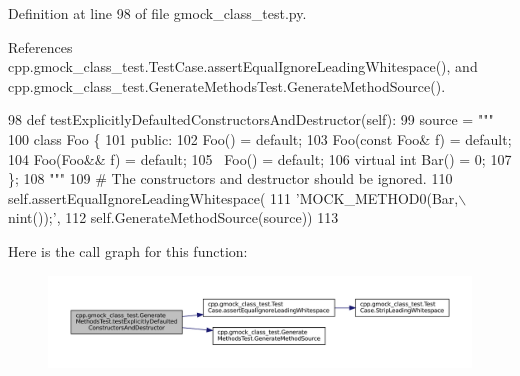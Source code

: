 Definition at line 98 of file gmock\+\_\+class\+\_\+test.\+py.



References cpp.\+gmock\+\_\+class\+\_\+test.\+Test\+Case.\+assert\+Equal\+Ignore\+Leading\+Whitespace(), and cpp.\+gmock\+\_\+class\+\_\+test.\+Generate\+Methods\+Test.\+Generate\+Method\+Source().


\begin{DoxyCode}
98   \textcolor{keyword}{def }testExplicitlyDefaultedConstructorsAndDestructor(self):
99     source = \textcolor{stringliteral}{"""}
100 \textcolor{stringliteral}{class Foo \{}
101 \textcolor{stringliteral}{ public:}
102 \textcolor{stringliteral}{  Foo() = default;}
103 \textcolor{stringliteral}{  Foo(const Foo& f) = default;}
104 \textcolor{stringliteral}{  Foo(Foo&& f) = default;}
105 \textcolor{stringliteral}{  ~Foo() = default;}
106 \textcolor{stringliteral}{  virtual int Bar() = 0;}
107 \textcolor{stringliteral}{\};}
108 \textcolor{stringliteral}{"""}
109     \textcolor{comment}{# The constructors and destructor should be ignored.}
110     self.assertEqualIgnoreLeadingWhitespace(
111         \textcolor{stringliteral}{'MOCK\_METHOD0(Bar,\(\backslash\)nint());'},
112         self.GenerateMethodSource(source))
113 
\end{DoxyCode}
Here is the call graph for this function\+:
\nopagebreak
\begin{figure}[H]
\begin{center}
\leavevmode
\includegraphics[width=350pt]{classcpp_1_1gmock__class__test_1_1GenerateMethodsTest_a0a2a15e9eb43aff0fec7e89a81c30987_cgraph}
\end{center}
\end{figure}
\mbox{\label{classcpp_1_1gmock__class__test_1_1GenerateMethodsTest_a4e6c2d2de1e21e63672ebbb75676c45c}} 
